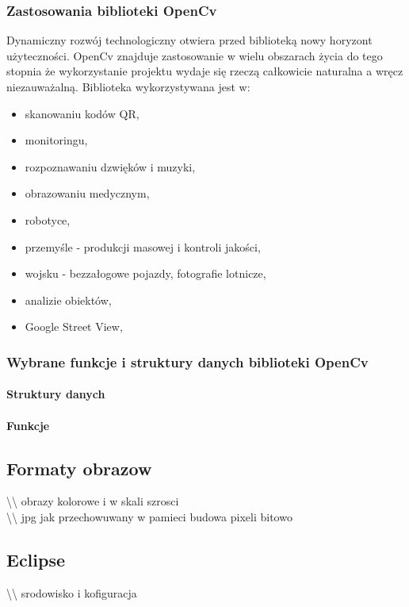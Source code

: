 \documentclass[a4paper,12pt]{article}
\begin{document}
\subsubsection{Zastosowania biblioteki OpenCv}
Dynamiczny rozwój technologiczny otwiera przed biblioteką nowy horyzont użyteczności.
OpenCv znajduje zastosowanie w wielu obszarach życia do tego stopnia że wykorzystanie projektu wydaje się rzeczą całkowicie naturalna a wręcz niezauważalną. Biblioteka wykorzystywana jest w:
\begin{itemize}
	\item skanowaniu kodów QR,
	\item monitoringu,
	\item rozpoznawaniu dzwięków i muzyki,
	\item obrazowaniu medycznym,
	\item robotyce,	
	\item przemyśle - produkcji masowej i kontroli jakości,
	\item wojsku - bezzałogowe pojazdy, fotografie lotnicze,
	\item analizie obiektów,
	\item Google Street View,
\end{itemize}

\subsubsection{Wybrane funkcje i struktury danych biblioteki OpenCv}
\paragraph{Struktury danych}
\paragraph{Funkcje}

\subsection{Formaty obrazow}
\textbackslash\textbackslash
obrazy kolorowe i w skali szrosci\\
\textbackslash\textbackslash
jpg jak przechowuwany w pamieci budowa pixeli bitowo

\subsection{Eclipse}
\textbackslash\textbackslash
srodowisko i kofiguracja
\end{document}
